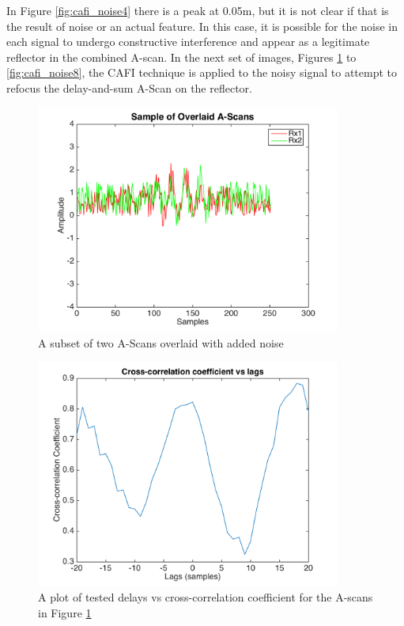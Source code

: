 In Figure \ref{fig:cafi_noise4} there is a peak at 0.05m, but it is not clear if that is the result of noise or an actual feature. In this case, it is possible for the noise in each signal to undergo constructive interference and appear as a legitimate reflector in the combined A-scan. In the next set of images, Figures \ref{fig:cafi_noise5} to \ref{fig:cafi_noise8}, the CAFI technique is applied to the noisy signal to attempt to refocus the delay-and-sum A-Scan on the reflector.

\begin{figure}[htb]
\centering
		\includegraphics[width=100mm]{Noise_5.png}
		\caption{A subset of two A-Scans overlaid with added noise}
		\label{fig:cafi_noise5}
\end{figure}
\begin{figure}[htb]
\centering
		\includegraphics[width=100mm]{Noise_10.png}
		\caption{A plot of tested delays vs cross-correlation coefficient for the A-scans in Figure \ref{fig:cafi_noise5}}
		\label{fig:cafi_noise10}
\end{figure}
